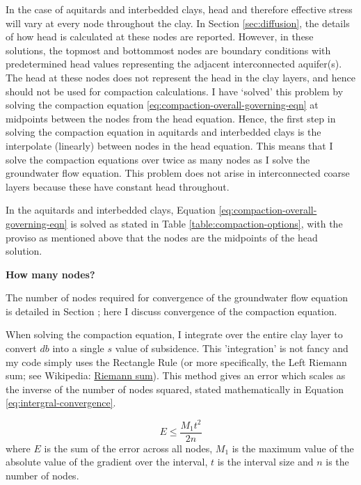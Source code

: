 \documentclass{article}
\begin{document}
In the case of aquitards and interbedded clays, head and therefore effective stress will vary at every node throughout the clay. In Section \ref{sec:diffusion}, the details of how head is calculated at these nodes are reported. However, in these solutions, the topmost and bottommost nodes are boundary conditions with predetermined head values representing the adjacent interconnected aquifer(s). The head at these nodes does not represent the head in the clay layers, and hence should not be used for compaction calculations. I have `solved' this problem by solving the compaction equation \ref{eq:compaction-overall-governing-eqn} at midpoints between the nodes from the head equation. Hence, the first step in solving the compaction equation in aquitards and interbedded clays is the interpolate (linearly) between nodes in the head equation. This means that I solve the compaction equations over twice as many nodes as I solve the groundwater flow equation. This problem does not arise in interconnected coarse layers because these have constant head throughout.

In the aquitards and interbedded clays, Equation \ref{eq:compaction-overall-governing-eqn} is solved as stated in Table \ref{table:compaction-options}, with the proviso as mentioned above that the nodes are the midpoints of the head solution. 

\textbf{How many nodes?}

The number of nodes required for convergence of the groundwater flow equation is detailed in Section \label{sec:Convergence_gwflow}; here I discuss convergence of the compaction equation.

When solving the compaction equation, I integrate over the entire clay layer to convert $ db $ into a single $ s $ value of subsidence. This 'integration' is not fancy and my code simply uses the Rectangle Rule (or more specifically, the Left Riemann sum; see Wikipedia: \href{https://en.wikipedia.org/wiki/Riemann_sum#Left_Riemann_sum}{Riemann sum}). This method gives an error which scales as the inverse of the number of nodes squared, stated mathematically in Equation \ref{eq:intergral-convergence}.

\begin{equation}
E \leq  \frac{M_1 t^2}{2n}
\label{eq:intergral-convergence}
\end{equation}
where $E$ is the sum of the error across all nodes, $M_1$ is the maximum value of the absolute value of the gradient over the interval, $t$ is the interval size and $n$ is the number of nodes. 
\end{document}

